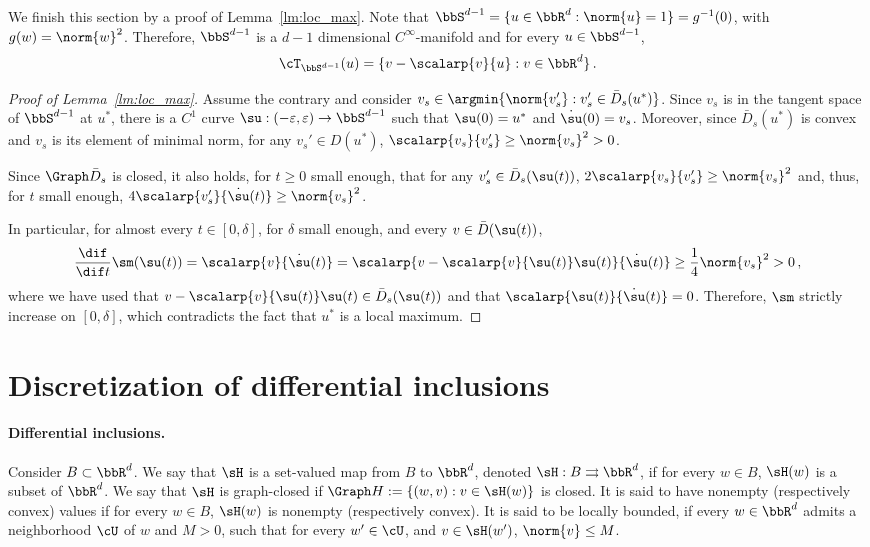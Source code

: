 We finish this section by a proof of Lemma~\ref{lm:loc_max}. Note that 
$\bbS^{d-1} = \{ u \in\bbR^d: \norm{u} =1\} = g^{-1}(0)$, with $g(w) = \norm{w}^2$. Therefore, $\bbS^{d-1}$ is a $d-1$ dimensional $C^{\infty}$-manifold and for every $u \in \bbS^{d-1}$, 
\begin{equation}\label{eq:tang_sphere}
\cT_{\bbS^{d-1}}(u) = \{v - \scalarp{v}{u} : v \in \bbR^d \}\, .
\end{equation}


\begin{proof}[Proof of Lemma~\ref{lm:loc_max}]
  Assume the contrary and consider $v_s \in \argmin \{ \norm{v_s'}: v_s' \in \bar{D}_s(u^*)\}$. Since $v_s$ is in the tangent space of $\bbS^{d-1}$ at $u^*$, there is a $C^1$ curve $\su: (-\varepsilon, \varepsilon) \rightarrow \bbS^{d-1}$ such that $\su(0) = u^*$ and $\dot{\su}(0) = v_s$. Moreover, since $\bar{D}_s(u^*)$ is convex and $v_s$ is its element of minimal norm, for any $v_s'\in D(u^*)$, $\scalarp{v_s}{v_s'} \geq \norm{v_s}^2 >0$. 
  
  Since $\Graph \bar{D}_s$ is closed, it also holds, for $t \geq 0$ small enough, that for any $v_s' \in \bar{D}_s(\su(t))$, $2\scalarp{v_s}{v_s'} \geq \norm{v_s}^2$ and, thus, for $t$ small enough, $4\scalarp{v_s'}{\dot{\su}(t)} \geq \norm{v_s}^2$. 
  
  In particular, for almost every $t \in [0,\delta]$, for $\delta$ small enough, and every $v \in \bar{D}(\su(t))$, 
  \begin{equation*}
    \frac{\dif}{\dif t}\sm(\su(t)) = \scalarp{v}{\dot{\su}(t)} = \scalarp{ v - \scalarp{v}{\su(t)}\su(t)}{\dot{\su}(t)} \geq \frac{1}{4}\norm{v_s}^2 >0 \, ,
  \end{equation*}
  where we have used that $v - \scalarp{v}{\su(t)}\su(t) \in \bar{D}_s(\su(t))$ and that $\scalarp{\su(t)}{\dot{\su}(t)} = 0$.
  Therefore, $\sm$ strictly increase on $[0, \delta]$, which contradicts the fact that $u^*$ is a local maximum.
\end{proof}




\section{Discretization of differential inclusions}\label{app:interp}

\paragraph{Differential inclusions.}
Consider $B \subset \bbR^d$. We say that $\sH$ is a set-valued map from $B$ to $\bbR^d$, denoted $\sH: B \rightrightarrows \bbR^d$, if for every $w \in B$, $\sH(w)$ is a subset of $\bbR^d$. We say that $\sH$ is graph-closed if $\Graph H := \{(w,v): v \in \sH(w) \}$ is closed. It is said to have nonempty (respectively convex) values if for every $w \in B$, $\sH(w)$ is nonempty (respectively convex). It is said to be locally bounded, if every $w \in \bbR^d$ admits a neighborhood $\cU$ of $w$ and $M>0$, such that for every $w' \in \cU$, and $v \in \sH(w')$, $\norm{v} \leq M$.

